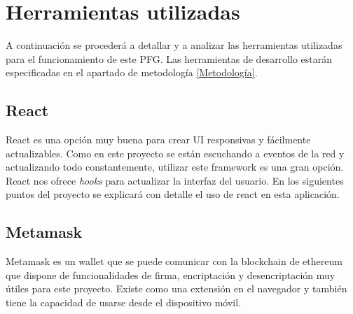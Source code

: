 \chapter{Herramientas utilizadas}\label{Herramientas utilizadas}

\thispagestyle{fancy}

A continuación se procederá a detallar y a analizar las herramientas utilizadas para el funcionamiento de este PFG. Las herramientas de desarrollo estarán especificadas en el apartado de metodología \ref{Metodología}.
\section{React}
React es una opción muy buena para crear UI responsivas y fácilmente actualizables. Como en este proyecto se están escuchando a eventos de la red y actualizando todo constantemente, utilizar este framework es una gran opción. React nos ofrece \textit{hooks} para actualizar la interfaz del usuario. 
En los siguientes puntos del proyecto se explicará con detalle el uso de react en esta aplicación.
\section{Metamask}
Metamask es un wallet que se puede comunicar con la blockchain de ethereum que dispone de funcionalidades de firma, encriptación y desencriptación muy útiles para este proyecto. Existe como una extensión en el navegador y también tiene la capacidad de usarse desde el dispositivo móvil.
